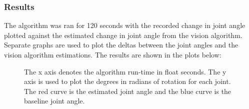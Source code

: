 \documentclass[./writeup.tex]{subfiles}
\begin{document}
\subsubsection{Results}
The algorithm was ran for 120 seconds with the recorded change in joint angle plotted against the estimated change in joint angle from the vision algorithm. Separate graphs are used to plot the deltas between the joint angles and the vision algorithm estimations. The results are shown in the plots below:
\begin{figure}[h!]
\centering
{}\hfill
{}\hfill
{}
\caption{The x axis denotes the algorithm run-time in float seconds. The y axis is used to plot the degrees in radians of rotation for each joint. The red curve is the estimated joint angle and the blue curve is the baseline joint angle.}
\end{figure}
\end{document}
